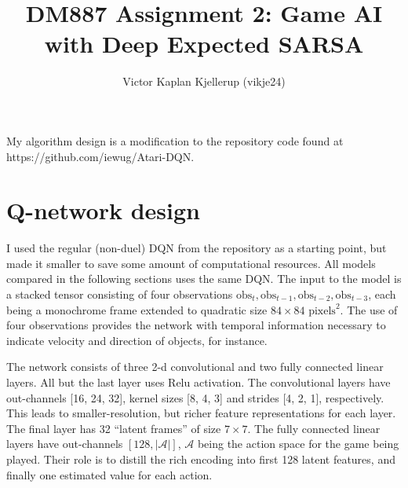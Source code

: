 \documentclass{article}
\begin{document}
\title{DM887 Assignment 2: Game AI with Deep Expected SARSA}
\author{Victor Kaplan Kjellerup (vikje24)}
\date{}  %
\maketitle


My algorithm design is a modification to the repository code found at https://github.com/iewug/Atari-DQN.

\section{Q-network design}
I used the regular (non-duel) DQN from the repository as a starting point, but made it smaller to save some amount of computational resources. All models compared in the following sections uses the same DQN. The input to the model is a stacked tensor consisting of four observations \(\text{obs}_t, \text{obs}_{t-1}, \text{obs}_{t-2}, \text{obs}_{t-3}\), each being a monochrome frame extended to quadratic size \(84 \times 84\) \(\text{pixels}^2\). The use of four observations provides the network with temporal information necessary to indicate velocity and direction of objects, for instance.

The network consists of three 2-d convolutional and two fully connected linear layers. All but the last layer uses Relu activation. The convolutional layers have out-channels [16, 24, 32], kernel sizes [8, 4, 3] and strides [4, 2, 1], respectively. This leads to smaller-resolution, but richer feature representations for each layer. The final layer has 32 ``latent frames'' of size \(7 \times 7\). The fully connected linear layers have out-channels \([128, |\mathcal{A}|]\), \(\mathcal{A}\) being the action space for the game being played. Their role is to distill the rich encoding into first 128 latent features, and finally one estimated value for each action.
\end{document}
